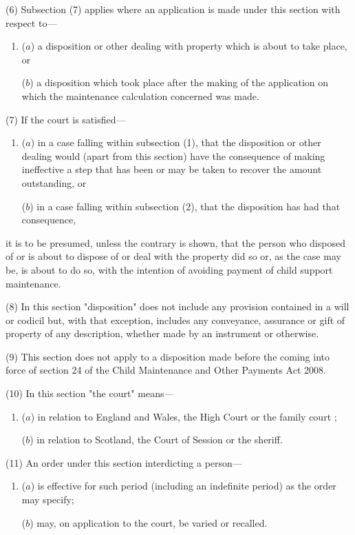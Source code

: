 \documentclass[a4paper]{article}
\begin{document}
(6)
Subsection (7) applies where an application is made under this section with respect to---
\begin{enumerate}\item[]
($a$) a disposition or other dealing with property which is about to take place, or

($b$) a disposition which took place after the making of the application on which the maintenance calculation concerned was made.
\end{enumerate}

(7) If the court is satisfied---
\begin{enumerate}\item[]
($a$) in a case falling within subsection (1), that the disposition or other dealing would (apart from this section) have the consequence of making ineffective a step that has been or may be taken to recover the amount outstanding, or

($b$) in a case falling within subsection (2), that the disposition has had that consequence,
\end{enumerate}
it is to be presumed, unless the contrary is shown, that the person who disposed of or is about to dispose of or deal with the property did so or, as the case may be, is about to do so, with the intention of avoiding payment of child support maintenance.

(8)
In this section "disposition" does not include any provision contained in a will or codicil but, with that exception, includes any conveyance, assurance or gift of property of any description, whether made by an instrument or otherwise.

(9)
This section does not apply to a disposition made before the coming into force of section 24 of the Child Maintenance and Other Payments Act 2008.

(10)
In this section "the court" means---
\begin{enumerate}\item[]
($a$) in relation to England and Wales, the High Court
or the family court%
;

($b$) in relation to Scotland, the Court of Session or the sheriff.
\end{enumerate}

(11) An order under this section interdicting a person---
\begin{enumerate}\item[]
($a$) is effective for such period (including an indefinite period) as the order may specify;

($b$) may, on application to the court, be varied or recalled.
\end{enumerate}
\end{document}
